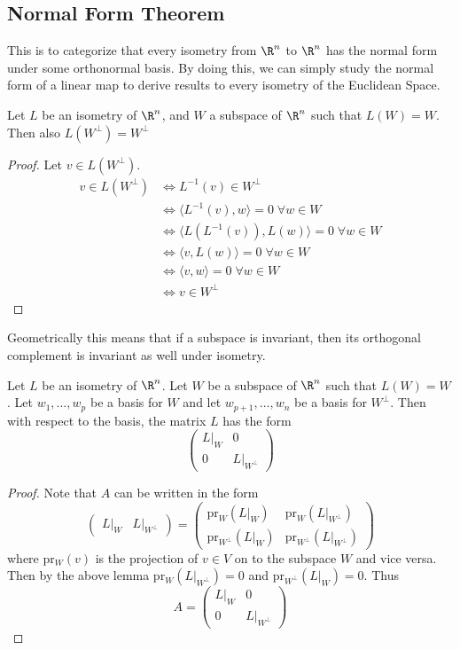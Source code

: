 \subsection{Normal Form Theorem}
This is to categorize that every isometry from $\R^n$ to $\R^n$ has the normal form under some orthonormal basis. By doing this, we can simply study the normal form of a linear map to derive results to every isometry of the Euclidean Space. 
\begin{lmm}{}{} Let $L$ be an isometry of $\R^n$, and $W$ a subspace of $\R^n$ such that $L(W)=W$. Then also $L(W^\perp)=W^\perp$\tcbline
\begin{proof} Let $v\in L(W^{\perp})$. 
\begin{align*}
v\in L(W^\perp)&\iff L^{-1}(v)\in W^\perp\\
&\iff\langle L^{-1}(v),w\rangle=0\;\forall w\in W\\
&\iff\langle L(L^{-1}(v)),L(w)\rangle=0\;\forall w\in W\\
&\iff\langle v,L(w)\rangle=0\;\forall w\in W\\
&\iff\langle v,w\rangle=0\;\forall w\in W\\
&\iff v\in W^\perp
\end{align*}
\end{proof}
\end{lmm}

Geometrically this means that if a subspace is invariant, then its orthogonal complement is invariant as well under isometry. 

\begin{crl}{}{} Let $L$ be an isometry of $\R^n$. Let $W$ be a subspace of $\R^n$ such that $L(W)=W$. Let $w_1,\dots,w_p$ be a basis for $W$ and let $w_{p+1},\dots,w_n$ be a basis for $W^\perp$. Then with respect to the basis, the matrix $L$ has the form $$\begin{pmatrix}
L|_W & 0\\
0 & L|_{W^\perp}
\end{pmatrix}$$\tcbline
\begin{proof}
Note that $A$ can be written in the form $$\begin{pmatrix}L|_W & L|_{W^\perp}\end{pmatrix}=\begin{pmatrix}\text{pr}_W(L|_W) & \text{pr}_W(L|_{W^\perp})\\ \text{pr}_{W^\perp}(L|_W) & \text{pr}_{W^\perp}(L|_{W^\perp})\end{pmatrix}$$ where pr$_W(v)$ is the projection of $v\in V$ on to the subspace $W$ and vice versa. Then by the above lemma pr$_W(L|_{W^\perp})=0$ and pr$_{W^\perp}(L|_W)=0$. Thus $$A=\begin{pmatrix}
L|_W & 0\\
0 & L|_{W^\perp}
\end{pmatrix}$$
\end{proof}
\end{crl}

